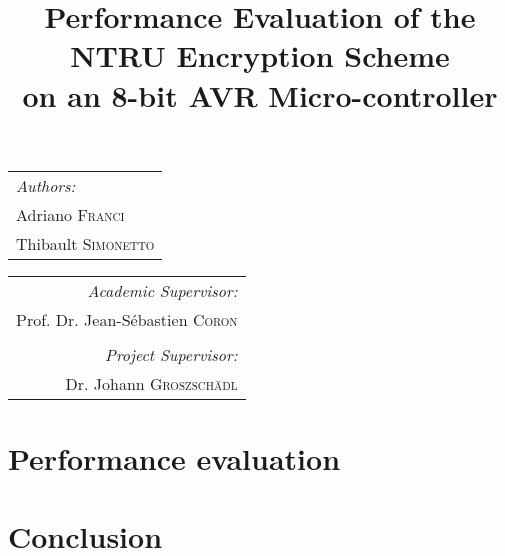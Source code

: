 \documentclass[11pt,a4paper]{article}
\begin{document}
\title{Performance Evaluation of the NTRU Encryption Scheme\\ on an 8-bit AVR 
Micro-controller}
\maketitle

\begin{tabular}[t]{@{}l} 
	\textit{Authors:}\\
	Adriano \textsc{Franci}\\
	Thibault \textsc{Simonetto}\\
\end{tabular}
\hfill
\begin{tabular}[t]{r@{}}
	\textit{Academic Supervisor:}\\
	Prof. Dr. Jean-S\'ebastien \textsc{Coron}\\
	\vspace{1em}\\
	\textit{Project Supervisor:}\\
	Dr. Johann \textsc{Groszsch\"adl}\\
\end{tabular}









\section{Performance evaluation}
\section{Conclusion}




\end{document}
